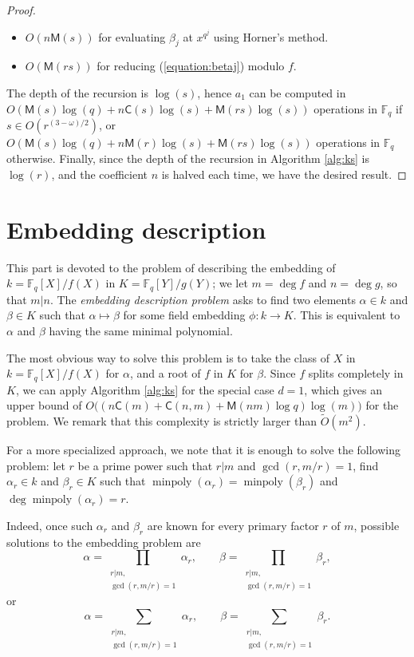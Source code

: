 \documentclass[12pt]{article}
\theoremstyle{plain}
\theoremstyle{definition}
\newcommand{\tildO}{\tilde{O}}
\DeclareMathOperator{\minpoly}{minpoly}
\def\F{\ensuremath{\mathbb{F}}}
\def\MM{\ensuremath{\mathsf{M}}}
\def\CC{\ensuremath{\mathsf{C}}}
\begin{document}
\begin{proof}
\begin{itemize}
	\item $O(n\MM(s))$ for evaluating $\beta_j$ at $x^{q^j}$ using Horner's method.
	\item $O(\MM(rs))$ for reducing (\ref{equation:betaj}) modulo $f$.
\end{itemize}
The depth of the recursion is $\log(s)$, hence $a_1$ can be computed in $O(\MM(s)\log(q) + 
n\CC(s)\log(s) + \MM(rs)\log(s))$ operations in $\F_q$ if $s \in O(r^{(3 - \omega) / 2})$, or
$O(\MM(s)\log(q) + n\MM(r)\log(s) + \MM(rs)\log(s))$ operations in $\F_q$ otherwise. Finally, since 
the depth of the recursion in Algorithm \ref{alg:ks} is $\log(r)$, and the coefficient $n$ is 
halved each time, we have the desired result.
\end{proof}









\part{Embedding description}

This part is devoted to the problem of describing the embedding of
$k=\F_q[X]/f(X)$ in $K=\F_q[Y]/g(Y)$; we let $m=\deg f$ and
$n=\deg g$, so that $m|n$. The \emph{embedding description problem}
asks to find two elements $\alpha\in k$ and $\beta\in K$ such that
$\alpha\mapsto\beta$ for some field embedding $\phi:k\to K$. This is
equivalent to $\alpha$ and $\beta$ having the same minimal polynomial.

The most obvious way to solve this problem is to take the class of $X$
in $k=\F_q[X]/f(X)$ for $\alpha$, and a root of $f$ in $K$ for
$\beta$. Since $f$ splits completely in $K$, we can apply Algorithm
\ref{alg:ks} for the special case $d = 1$, which gives an upper bound
of $O\bigl((n\CC(m) + \CC(n,m) + \MM(nm)\log q)\log(m)\bigr)$ for the
problem. We remark that this complexity is strictly larger than
$\tildO(m^2)$.

For a more specialized approach, we note that it is enough to solve
the following problem: let $r$ be a prime power such that $r|m$ and
$\gcd(r,m/r)=1$, find $\alpha_r\in k$ and $\beta_r\in K$ such that
$\minpoly(\alpha_r)=\minpoly(\beta_r)$ and $\deg\minpoly(\alpha_r)=r$.

Indeed, once such $\alpha_r$ and $\beta_r$ are known for every primary
factor $r$ of $m$, possible solutions to the embedding problem are
\begin{equation*}
  \alpha = \prod_{\substack{r|m,\\\gcd(r,m/r)=1}}\alpha_r,\qquad
  \beta = \prod_{\substack{r|m,\\\gcd(r,m/r)=1}}\beta_r,
\end{equation*}
or
\begin{equation*}
  \alpha = \sum_{\substack{r|m,\\\gcd(r,m/r)=1}}\alpha_r,\qquad
  \beta = \sum_{\substack{r|m,\\\gcd(r,m/r)=1}}\beta_r.
\end{equation*}
\end{document}

